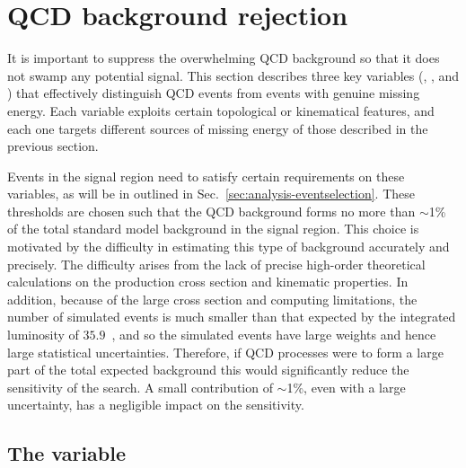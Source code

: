 \section{QCD background rejection}
\label{sec:analysis-qcdrejection}

It is important to suppress the overwhelming QCD background so that it does not 
swamp any potential signal. This section describes three key variables 
(\alphat, \bdphi, and \mhtmet) that effectively distinguish QCD events from 
events with genuine missing energy. Each variable exploits certain topological 
or kinematical features, and each one targets different sources of missing 
energy of those described in the previous section.

Events in the signal region need to satisfy certain requirements on these 
variables, as will be in outlined in Sec.~\ref{sec:analysis-eventselection}. 
These 
thresholds are chosen such that the QCD background forms no more than $\sim$1\% 
of the total standard model background in the signal region. This choice is 
motivated by the difficulty in estimating this type of background accurately 
and precisely. The difficulty arises from the lack of precise high-order 
theoretical calculations on the production cross section and kinematic 
properties. 
In addition, because of the large cross section and computing limitations, the 
number of simulated events is much smaller than that expected by the integrated 
luminosity of $35.9$~\ifb, and so the simulated events have large weights and 
hence large statistical uncertainties.
Therefore, if QCD processes were to form a large part of the total expected 
background this would significantly reduce the sensitivity of the search. A 
small contribution of $\sim$1\%, even with a large uncertainty, has a 
negligible impact on the sensitivity.


\subsection{The \alphat variable}


